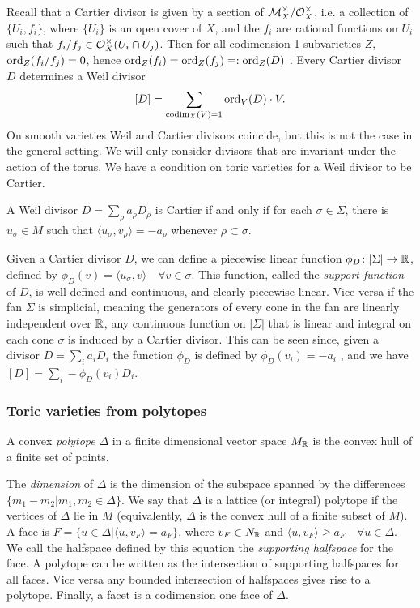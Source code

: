 \documentclass[../main.tex]{subfiles}
\begin{document}
Recall that a Cartier divisor is given by a section of $\mathcal{M}_X^\times / \mathcal{O}_X^\times $, i.e. a collection of $\{U_i,f_i \}$, where $\{U_i\}$ is an open cover of $X$, and the $f_i$ are rational functions on $U_i$ such that $f_i / f_j \in \mathcal{O}_X^\times(U_i \cap U_j)$. Then for all codimension-1 subvarieties $Z$, $\operatorname{ord}_Z(f_i / f_j)=0$, hence $\operatorname{ord}_Z(f_i)=\operatorname{ord}_Z(f_j) \mathrel{\mathop=}: \operatorname{ord}_Z(D)$ . Every Cartier divisor $D$ determines a Weil divisor
\[
[D] = \sum_{\operatorname{codim}_X(V )=1} \operatorname{ord}_V (D) \cdot V.
\]
On smooth varieties Weil and Cartier divisors coincide, but this is not the case in the general setting. We will only consider divisors that are invariant under the action of the torus. We have a condition on toric varieties for a Weil divisor to be Cartier. 
\begin{proposition} \textup{\cite[Thm. 4.2.8]{CLS11}} \label{CartierWeil}
    A Weil divisor $D = \sum_{\rho} a_\rho D_\rho$ is Cartier if and only if for each $\sigma \in \Sigma $, there is $u_\sigma \in M$ such that $\langle u_\sigma , v_\rho \rangle = -a_\rho$ whenever $\rho \subset \sigma$.
\end{proposition}

Given a Cartier divisor $D$, we can define a piecewise linear function
$\phi_D \colon |\Sigma| \to \mathbb{R}$, defined by $\phi_D(v) = \langle u_\sigma, v \rangle \quad \forall v \in \sigma$.
This function, called the \emph{support function} of $D$, is well defined and continuous, and clearly piecewise linear.
Vice versa if the fan $\Sigma$ is simplicial, meaning the generators of every cone in the fan are linearly independent over $\mathbb{R}$, any continuous function on $|\Sigma|$ that is linear and integral on each cone $\sigma$ is induced by a Cartier divisor. This can be seen since, given a divisor $D = \sum_i a_i D_i$ the function $\phi_D$ is defined by $\phi_D(v_i) = -a_i$ , and we have $[D] = \sum_i -\phi_D(v_i) D_i$.

\subsubsection{Toric varieties from polytopes}

   \begin{defn}
       A convex \emph{polytope} $\Delta$ in a finite dimensional vector space $M_{\mathbb{R}}$ is the convex hull of a finite set of points.
   \end{defn}  The \emph{dimension} of $\Delta$ is the dimension of the subspace spanned by the differences $\{ m_1 - m_2 | m_1,m_2 \in \Delta\}$. We say that $\Delta$ is a lattice (or integral) polytope if the vertices of $\Delta$ lie in $M$ (equivalently, $\Delta$ is the convex hull of a finite subset of $M$). A face is $F = \{ u \in \Delta | \langle u, v_F \rangle = a_F \}$, where $v_F \in N_{\mathbb{R}}$ and $\langle u, v_F\rangle \geq a_F \quad \forall u \in \Delta$. We call the halfspace defined
by this equation the \emph{supporting halfspace} for the face.
A polytope can be written as the intersection of supporting halfspaces for all faces. Vice versa any bounded intersection of halfspaces gives rise to a polytope.
Finally, a facet is a codimension one face of $\Delta$.
\end{document}
